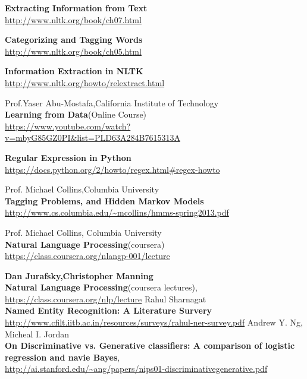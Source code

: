 \documentclass[12pt]{report}
\begin{document}
\begin{thebibliography}{99}
\textbf{Extracting Information from Text}\\
\url{http://www.nltk.org/book/ch07.html}

\textbf{Categorizing and Tagging Words}\\
\url{http://www.nltk.org/book/ch05.html}

\textbf{Information Extraction in NLTK}\\
\url{http://www.nltk.org/howto/relextract.html}

Prof.Yaser Abu-Mostafa,California Institute of Technology\\
\textbf{Learning from Data}(Online Course)\\
\url{https://www.youtube.com/watch?v=mbyG85GZ0PI&list=PLD63A284B7615313A}

\textbf{Regular Expression in Python}\\
\url{https://docs.python.org/2/howto/regex.html#regex-howto}

Prof. Michael Collins,Columbia University\\
\textbf{Tagging Problems, and Hidden Markov Models}\\
\url{http://www.cs.columbia.edu/~mcollins/hmms-spring2013.pdf}

Prof. Michael Collins, Columbia University\\
\textbf{Natural Language Processing}(coursera)\\
\url{https://class.coursera.org/nlangp-001/lecture}

\textbf{Dan Jurafsky,Christopher Manning}\\
\textbf{Natural Language Processing}(coursera lectures),\\
\url{https://class.coursera.org/nlp/lecture}
Rahul Sharnagat\\
\textbf{Named Entity Recognition: A Literature Survery}\\
\url{http://www.cfilt.iitb.ac.in/resources/surveys/rahul-ner-survey.pdf}
Andrew Y. Ng, Micheal I. Jordan\\
\textbf{On Discriminative vs. Generative classifiers: A comparison of logistic regression
 and navie Bayes},\\
 \url{http://ai.stanford.edu/~ang/papers/nips01-discriminativegenerative.pdf} 
\end{thebibliography}
\end{document}
